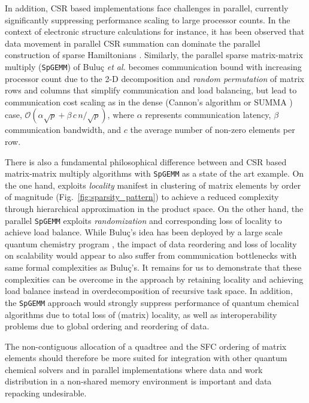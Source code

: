 In addition, CSR based implementations face challenges in parallel, currently
significantly suppressing performance scaling to large processor counts. In
the context of electronic structure calculations for instance, it has been
observed that data movement in parallel CSR summation can dominate the
parallel construction of sparse Hamiltonians \cite{10.1063/1.1568734}.
Similarly, the parallel sparse matrix-matrix multiply ({\tt SpGEMM}) of
Bulu\c{c} \emph{et al.} \cite{Buluc:2008:SpMM, buluc2011parallel} becomes
communication bound with increasing processor count due to the 2-D
decomposition and {\em random permutation} of matrix rows and columns that
simplify communication and load balancing, but lead to communication cost
scaling as in the dense (Cannon's algorithm \cite{cannon1969cellular} or SUMMA
\cite{van1997summa}) case, $\mathcal{O} \left( \alpha \sqrt{p} + \beta \, c \,
n / \sqrt{p} \right)$, where $\alpha$ represents communication latency,
$\beta$ communication bandwidth, and $c$ the average number of non-zero
elements per row.

There is also a fundamental philosophical difference between \SpAMM{} and CSR
based matrix-matrix multiply algorithms with {\tt SpGEMM} as a state of the
art example. On the one hand, \SpAMM{} exploits \emph{locality} manifest in
clustering of matrix elements by order of magnitude
(Fig.~\ref{fig:sparsity_pattern}) to achieve a reduced complexity through
hierarchical approximation in the product space. On the other hand, the
parallel {\tt SpGEMM} exploits \emph{randomization} and corresponding loss of
locality to achieve load balance. While Bulu\c{c}'s idea has been deployed by
a large scale quantum chemistry program \cite{VandeVondele2012}, the impact of
data reordering and loss of locality on scalability would appear to also
suffer from communication bottlenecks with same formal complexities as
Bulu\c{c}'s.  It remains for us to demonstrate that these complexities can be
overcome in the \SpAMM{} approach by retaining locality and achieving load
balance instead in overdecomposition of recursive task space.  In addition,
the {\tt SpGEMM} approach would strongly suppress performance of quantum
chemical algorithms due to total loss of (matrix) locality,  as well as
interoperability problems due to global ordering and reordering of data.

The non-contiguous allocation of a quadtree and the SFC ordering of matrix
elements should therefore be more suited for integration with other quantum
chemical solvers and in parallel implementations where data and work
distribution in a non-shared memory environment is important and data
repacking undesirable.

